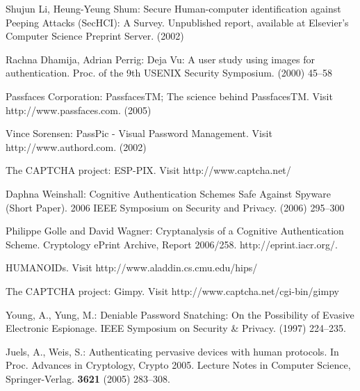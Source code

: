 \documentclass{llncs}
\begin{document}
\begin{thebibliography}{1}
Shujun Li, Heung-Yeung Shum:
Secure Human-computer identification 
against Peeping Attacks (SecHCI): A Survey.
Unpublished report, available at Elsevier's Computer Science Preprint Server.  (2002)

Rachna Dhamija, Adrian Perrig:
Deja Vu: A user study using images for 
authentication.
Proc. of the 9th USENIX Security Symposium. (2000) 45--58

Passfaces Corporation:
PassfacesTM; The science behind PassfacesTM.
Visit http://www.passfaces.com. (2005)

Vince Sorensen:
PassPic - Visual Password Management.
Visit http://www.authord.com. (2002)

The CAPTCHA project:
ESP-PIX.
Visit http://www.captcha.net/

Daphna Weinshall:
Cognitive Authentication Schemes Safe Against Spyware (Short Paper).
2006 IEEE Symposium on Security and Privacy. (2006) 295--300

Philippe Golle and David Wagner:
Cryptanalysis of a Cognitive Authentication Scheme.
Cryptology ePrint Archive, Report 2006/258. http://eprint.iacr.org/.

HUMANOIDs.
Visit http://www.aladdin.cs.cmu.edu/hips/

The CAPTCHA project:
Gimpy.
Visit http://www.captcha.net/cgi-bin/gimpy

Young, A., Yung, M.:
Deniable Password Snatching: On the Possibility of Evasive Electronic Espionage.
IEEE Symposium on Security \& Privacy. (1997) 224--235.

Juels, A., Weis, S.:
Authenticating pervasive devices with human protocols.
In Proc. Advances in Cryptology, Crypto 2005. Lecture Notes in Computer Science, Springer-Verlag. {\bf 3621} (2005) 283--308.

\end{thebibliography}
\end{document}
